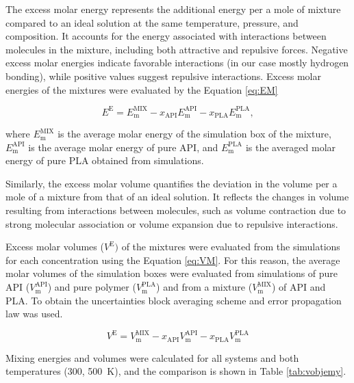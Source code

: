The excess molar energy represents the additional energy per a mole of mixture compared to an ideal solution at the same temperature, pressure, and composition. It accounts for the energy associated with interactions between molecules in the mixture, including both attractive and repulsive forces. Negative excess molar energies indicate favorable interactions (in our case mostly hydrogen bonding), while positive values suggest repulsive interactions. Excess molar energies of the mixtures were evaluated by the Equation \ref{eq:EM}

\begin{equation}\label{eq:EM}
	E^\text{E} = E_{\text{m}}^{\text{MIX}} - x_{\text{API}} E_{\text{m}}^{\text{API}} - x_{\text{PLA}} E_{\text{m}}^{\text{PLA}},
\end{equation}

where $E_{\text{m}}^{\text{MIX}}$ is the average molar energy of the simulation box of the mixture, $E_{\text{m}}^{\text{API}}$ is the average molar energy of pure API, and $E_{\text{m}}^{\text{PLA}}$ is the averaged molar energy of pure PLA obtained from simulations. 

Similarly, the excess molar volume quantifies the deviation in the volume per a mole of a mixture from that of an ideal solution. It reflects the changes in volume resulting from interactions between molecules, such as volume contraction due to strong molecular association or volume expansion due to repulsive interactions.

Excess molar volumes ($V^{\text{E}})$ of the mixtures were evaluated from the simulations for each concentration using the Equation \ref{eq:VM}. For this reason, the average molar volumes of the simulation boxes were evaluated from simulations of pure API ($V_{\text{m}}^{\text{API}} $) and pure polymer ($V_{\text{m}}^{\text{PLA}}$) and from a mixture ($V_{\text{m}}^{\text{MIX}}$) of API and PLA. To obtain the uncertainties block averaging scheme and error propagation law was used. 
 
\vspace{-0.2cm}

\begin{equation}\label{eq:VM}
	V^{\text{E}} = V_{\text{m}}^{\text{MIX}} - x_{\text{API}} V_{\text{m}}^{\text{API}} - x_{\text{PLA}} V_{\text{m}}^{\text{PLA}}
\end{equation}

Mixing energies and volumes were calculated for all systems and both temperatures (300, 500~K), and the comparison is shown in Table \ref{tab:vobjemy}.  
\vspace{-0.2cm}



